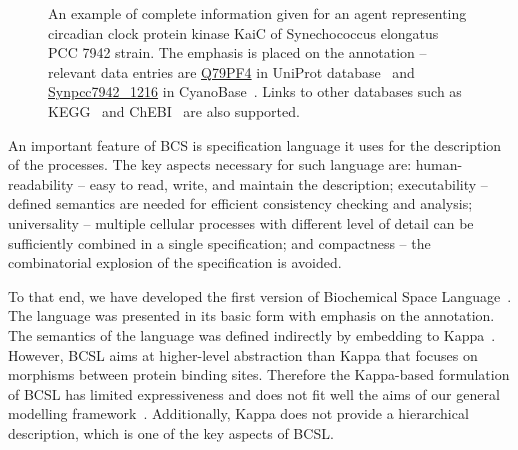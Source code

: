 \documentclass[11pt,a4paper]{report}
\begin{document}
\begin{figure}[!h]
  \begin{center}
  \end{center}
  \caption{An example of complete information given for an agent representing circadian clock protein kinase KaiC of Synechococcus elongatus PCC 7942 strain. The emphasis is placed on the annotation -- relevant data entries are \href{https://www.uniprot.org/uniprot/Q79PF4}{Q79PF4} in UniProt database~\cite{uniprot2016uniprot} and \href{http://genome.microbedb.jp/cyanobase/GCA_000012525.1/genes/Synpcc7942_1216}{Synpcc7942\_1216} in CyanoBase~\cite{nakao2009cyanobase}. Links to other databases such as KEGG~\cite{KEGG} and ChEBI~\cite{ChEBI} are also supported.}\label{entity_example}
\end{figure}

An important feature of BCS is specification language it uses for the description of the processes. The key aspects necessary for such language are: human-readability -- easy to read, write, and maintain the description; executability -- defined semantics are needed for efficient consistency checking and analysis; universality -- multiple cellular processes with different level of detail can be sufficiently combined in a single specification; and compactness -- the combinatorial explosion of the specification is avoided.

To that end, we have developed the first version of Biochemical Space Language~\cite{dved2016formal}. The language was presented in its basic form with emphasis on the annotation. The semantics of the language was defined indirectly by embedding to Kappa~\cite{kappa_formal}. However, BCSL aims at higher-level abstraction than Kappa that focuses on morphisms between protein binding sites. Therefore the Kappa-based formulation of BCSL has limited expressiveness and does not fit well the aims of our general modelling framework~\cite{klement2013comprehensive}. Additionally, Kappa does not provide a hierarchical description, which is one of the key aspects of BCSL.
\end{document}

